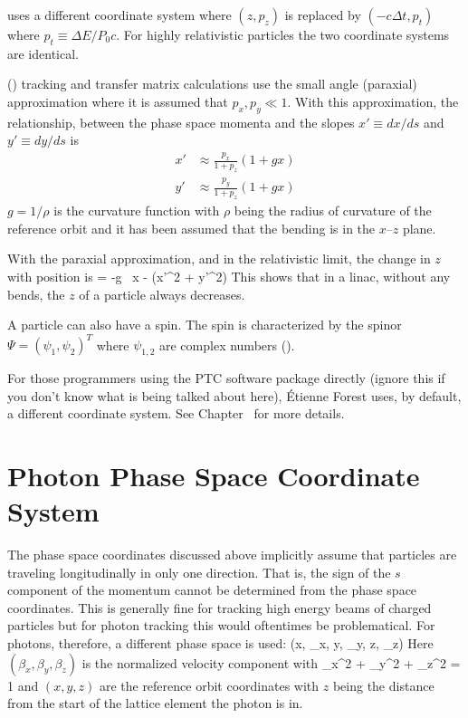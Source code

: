 \mad uses a different coordinate system where $(z, p_z)$ is
replaced by $(-c\Delta t, p_t)$ where $p_t \equiv \Delta E / P_0
c$. For highly relativistic particles the two coordinate systems are
identical.

 () tracking and transfer matrix
calculations use the small angle (paraxial) approximation where it is
assumed that $p_x, p_y \ll 1$. With this approximation, the
relationship, between the phase space momenta and the slopes $x' \equiv
dx/ds$ and $y' \equiv dy/ds$ is
\begin{align}
  x' &\approx \frac{p_x}{1 + p_z} (1 + g x) \\
  y' &\approx \frac{p_y}{1 + p_z} (1 + g x) 
  \label{xpa1p}
\end{align}
$g = 1/\rho$ is the curvature function with $\rho$ being the radius of
curvature of the reference orbit and it has been assumed that the
bending is in the $x$--$z$ plane. 

With the paraxial approximation, and in the relativistic limit, the
change in $z$ with position is
\Begineq
   = -g \, x -  (x'^2 + y'^2)
\Endeq
This shows that in a linac, without any bends, the $z$ of a particle
always decreases.

A particle can also have a spin. The spin is characterized by the
spinor $\Psi = \left( \psi_{1}, \psi_{2} \right)^{T}$ where
$\psi_{1,2}$ are complex numbers ().

For those programmers using the PTC
software package directly (ignore
this if you don't know what is being talked about here), \'Etienne Forest uses,
by default, a different coordinate system. See Chapter~ for more details.

\section{Photon Phase Space Coordinate System}
\label{s:photon.phase.space}

The phase space coordinates discussed above implicitly assume that
particles are traveling longitudinally in only one direction. That is,
the sign of the $s$ component of the momentum cannot be determined
from the phase space coordinates. This is generally fine for tracking
high energy beams of charged particles but for photon tracking this
would oftentimes be problematical. For photons, therefore, a different
phase space is used:
\Begineq
  (x, \beta_x, y, \beta_y, z, \beta_z)
  \label{xbybzb}
\Endeq
Here $(\beta_x, \beta_y, \beta_z)$ is the normalized velocity component with
\Begineq
  \beta_x^2 + \beta_y^2 + \beta_z^2 = 1 
  \label{bbb1}
\Endeq
and $(x, y, z)$ are the reference orbit coordinates with $z$ being the
distance from the start of the lattice element the photon is in.

